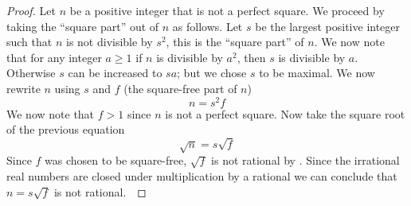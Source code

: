         \begin{proof}
            Let $n$ be a positive integer that is not a perfect square. We proceed by taking
            the ``square part'' out of $n$ as follows. Let $s$ be the largest positive integer
            such that $n$ is not divisible by $s^2$, this is the ``square part'' of $n$. We
            now note that for any integer $a \ge 1$ if $n$ is divisible by $a^2$, then
            $s$ is divisible by $a$. Otherwise $s$ can be increased to $sa$; but we chose $s$
            to be maximal. We now rewrite $n$ using $s$ and $f$ (the square-free part of $n$)
            \begin{equation}
                n = s^2 f
            \end{equation}
            We now note that $f > 1$ since $n$ is not a perfect square. Now take the square
            root of the previous equation
            \begin{equation}
                \sqrt{n} = s \sqrt{f}
            \end{equation}
            Since $f$ was chosen to be square-free, $\sqrt{f}$ is not rational by
            . Since the irrational real numbers
            are closed under multiplication by a rational we can conclude that $n = s \sqrt{f}$
            is not rational.~\QED
        \end{proof}
